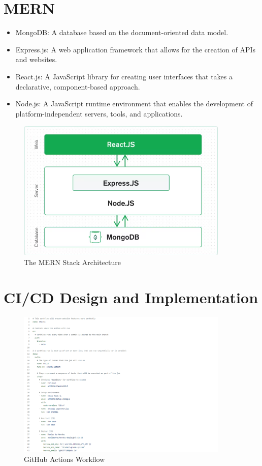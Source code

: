 \chapter{MERN}\label{appendix:mern}
\begin{itemize}
\item MongoDB: A database based on the document-oriented data model.
\item Express.js: A web application framework that allows for the creation of APIs and websites.
\item React.js: A JavaScript library for creating user interfaces that takes a declarative, component-based approach.
\item Node.js: A JavaScript runtime environment that enables the development of platform-independent servers, tools, and applications.
\end{itemize}

\begin{figure}[h!]
    \centering
    \includegraphics[width=0.9\textwidth]{images/mern.png}
    \caption{The MERN Stack Architecture}
    \label{image:mern}
\end{figure}

\chapter{CI/CD Design and Implementation}\label{appendix:CICD}
\begin{figure}[h!]
    \centering
    \includegraphics[width=0.9\textwidth]{images/full-workflow.png}
    \caption{GitHub Actions Workflow}
    \label{image:full-workflow}
\end{figure}

